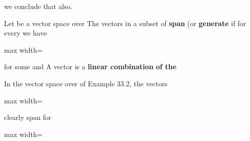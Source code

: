 \documentclass[11pt,oneside]{article}
\begin{document}
\begin{BookBody}
\noindent we conclude that  also. \BookEnd{\blacklozenge}


 Let  be a vector space over  The vectors in a subset  of  \textbf{span} (or \textbf{generate} if for every  we have

\begin{center}\begin{adjustbox}{max width=\linewidth}\end{adjustbox}\end{center}

\noindent for some  and  A vector  is a\textbf{ linear combination} \textbf{of the}  \BookEnd{\blacksquare}

 In the vector space  over  of Example 33.2, the vectors

\begin{center}\begin{adjustbox}{max width=\linewidth}\end{adjustbox}\end{center}

\noindent clearly span  for

\begin{center}\begin{adjustbox}{max width=\linewidth}\end{adjustbox}\end{center}


\end{BookBody}
\end{document}
